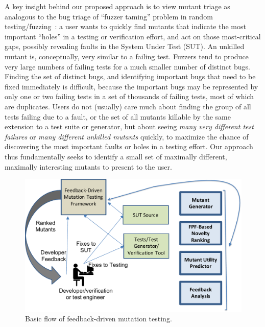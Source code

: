 A key insight behind our proposed approach is to view mutant triage as
analogous to the bug triage of  ``fuzzer
taming'' problem in random testing/fuzzing~\cite{PLDI13,SemCrash,vantonder-ase18}:  a user wants
to quickly find mutants that indicate the most important ``holes'' in a testing
or verification effort, and act on those most-critical gaps, possibly revealing
faults in the System Under Test (SUT). 
An unkilled mutant is, conceptually, very similar to a failing test.
Fuzzers tend to produce very large numbers of failing tests for a much
smaller number of distinct bugs.  Finding the set of distinct bugs,
and identifying important bugs that need to be fixed immediately is
difficult, because the important bugs may be represented by only one
or two failing tests in a set of thousands of failing tests, most of
which are duplicates. 
Users do not (usually) care much
about finding the group of all tests failing due to a fault, or the
set of all mutants killable by the same extension to a test suite or
generator, but about seeing \emph{many very different test failures}
or \emph{many
  different unkilled mutants} quickly, to maximize the chance of
discovering the most important faults or holes in a testing effort.
Our approach thus fundamentally seeks to identify a small set of maximally different, maximally interesting mutants to present
to the user. 

\begin{figure}
\centering
\includegraphics[width=0.8\columnwidth]{TestFlow}

\caption{Basic flow of feedback-driven mutation testing. }
\label{fig:flow}
\end{figure}

